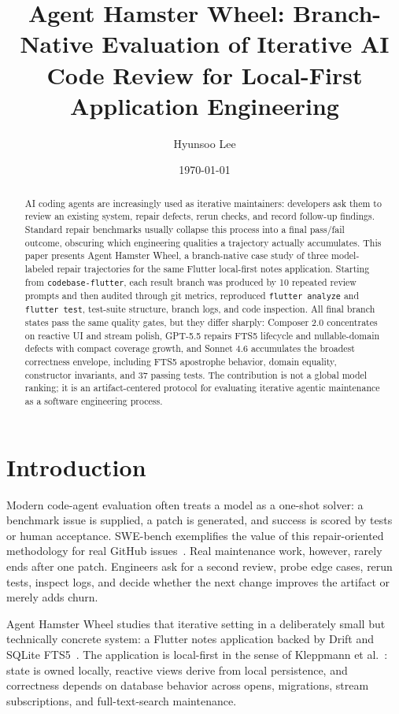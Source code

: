 \documentclass[11pt]{article}
\title{Agent Hamster Wheel: Branch-Native Evaluation of Iterative AI Code Review for Local-First Application Engineering}
\author{Hyunsoo Lee}
\date{\today}
\newcommand{\BaseBranch}{\texttt{codebase-\allowbreak flutter}}
\newcommand{\AnalyzeCmd}{\texttt{flutter analyze}}
\newcommand{\TestCmd}{\texttt{flutter test}}
\newcommand{\GateCmds}{\AnalyzeCmd{} and \TestCmd{}}
\newcommand{\RepeatedPrompts}{10}
\newcommand{\SonnetTests}{37}
\begin{document}
\maketitle

\begin{abstract}
AI coding agents are increasingly used as iterative maintainers: developers ask them to review an existing system, repair defects, rerun checks, and record follow-up findings. Standard repair benchmarks usually collapse this process into a final pass/fail outcome, obscuring which engineering qualities a trajectory actually accumulates. This paper presents Agent Hamster Wheel, a branch-native case study of three model-labeled repair trajectories for the same Flutter local-first notes application. Starting from \BaseBranch{}, each result branch was produced by \RepeatedPrompts{} repeated review prompts and then audited through git metrics, reproduced \GateCmds{}, test-suite structure, branch logs, and code inspection. All final branch states pass the same quality gates, but they differ sharply: Composer 2.0 concentrates on reactive UI and stream polish, GPT-5.5 repairs FTS5 lifecycle and nullable-domain defects with compact coverage growth, and Sonnet 4.6 accumulates the broadest correctness envelope, including FTS5 apostrophe behavior, domain equality, constructor invariants, and \SonnetTests{} passing tests. The contribution is not a global model ranking; it is an artifact-centered protocol for evaluating iterative agentic maintenance as a software engineering process.
\end{abstract}

\section{Introduction}
\label{sec:introduction}

Modern code-agent evaluation often treats a model as a one-shot solver: a benchmark issue is supplied, a patch is generated, and success is scored by tests or human acceptance. SWE-bench exemplifies the value of this repair-oriented methodology for real GitHub issues~\cite{jimenez2024swebench}. Real maintenance work, however, rarely ends after one patch. Engineers ask for a second review, probe edge cases, rerun tests, inspect logs, and decide whether the next change improves the artifact or merely adds churn.

Agent Hamster Wheel studies that iterative setting in a deliberately small but technically concrete system: a Flutter notes application backed by Drift and SQLite FTS5~\cite{drift,flutter,sqlitefts5}. The application is local-first in the sense of Kleppmann et al.~\cite{kleppmann2019localfirst}: state is owned locally, reactive views derive from local persistence, and correctness depends on database behavior across opens, migrations, stream subscriptions, and full-text-search maintenance.
\end{document}
